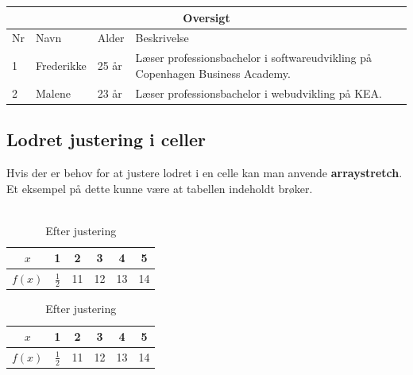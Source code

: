 \documentclass[11pt]{article}
\begin{document}
\begin{table}[H]
\centering
\begin{tabular}{|p{0.5cm}|p{2cm}|p{1cm}|p{6cm}|} %
\hline
\multicolumn{4}{|c|}{Oversigt}\\
\hline
Nr&Navn&Alder&Beskrivelse\\ \hline %
1&Frederikke&25 år &Læser professionsbachelor i softwareudvikling på Copenhagen Business Academy.\\ \hline
2&Malene&23 år&Læser professionsbachelor i webudvikling på KEA. \\ \hline
\end{tabular}
\end{table}

\subsection{Lodret justering i celler}
Hvis der er behov for at justere lodret i en celle kan man anvende \textbf{arraystretch}. Et eksempel på dette kunne være at tabellen indeholdt brøker. \\\\

\begin{table}[H]
\begin{subtable}[h]{0.45\textwidth}
\centering
\begin{tabular}{|c||c|c|c|c|c|} %
\hline
$x$&1&2&3&4&5\\ \hline %
$f(x)$&\(\frac{1}{2}\)&11&12&13&14\\ \hline
\end{tabular}
\caption{Før justering}
\end{subtable}
\begin{subtable}[h]{0.45\textwidth}
\def\arraystretch{1.5} 
\begin{tabular}{|c||c|c|c|c|c|} %

\hline
$x$&1&2&3&4&5\\ \hline %
$f(x)$&\(\frac{1}{2}\)&11&12&13&14\\ \hline
\end{tabular}
\caption{Efter justering}
\end{subtable}
\end{table}
\end{document}
